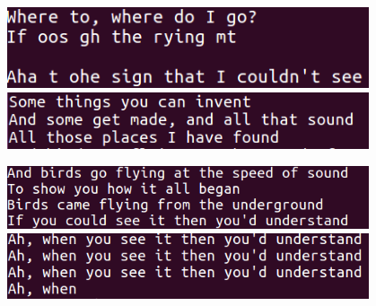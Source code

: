 \documentclass{article}
\begin{document}
\begin{flushleft}
\begin{itemize}
\begin{figure}[H]
\hfill
\begin{minipage}{0.3\textwidth}
\centering
\includegraphics[width=0.95\textwidth]{100(2)-0_01.png}
\end{minipage}
\hfill
\begin{minipage}{0.3\textwidth}
\centering
\includegraphics[width=0.95\textwidth]{100(3)-0_01.png}
\end{minipage}
\end{figure}
\begin{figure}[H]
\begin{minipage}{0.475\textwidth}
\centering
\includegraphics[width=0.95\textwidth]{100(4)-0_01.png}
\end{minipage}
\hfill
\begin{minipage}{0.475\textwidth}
\centering
\includegraphics[width=0.95\textwidth]{100(5)-0_01.png}
\end{minipage}
\end{figure}


\end{itemize}
\end{flushleft}
\end{document}
